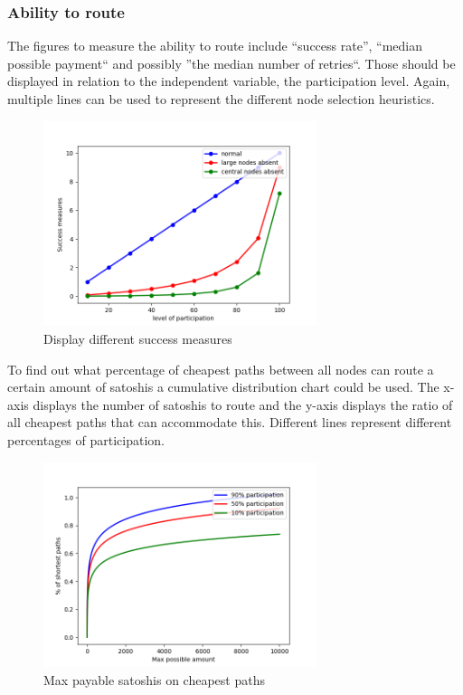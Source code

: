 \documentclass[final]{fhnwreport}       %
\begin{document}
\subsubsection{Ability to route}
The figures to measure the ability to route include ``success rate'', ``median possible payment`` and possibly ''the median number of retries``. Those should be displayed in relation to the independent variable, the participation level. Again, multiple lines can be used to represent the different node selection heuristics.

\begin{figure}[h]
\centering
\includegraphics[width=8cm]{dummy_charts/success_measure.png}
\caption{Display different success measures}
\label{fig:Figure}
\end{figure}

To find out what percentage of cheapest paths between all nodes can route a certain amount of satoshis a cumulative distribution chart could be used. The x-axis displays the number of satoshis to route and the y-axis displays the ratio of all cheapest paths that can accommodate this. Different lines represent different percentages of participation.

\begin{figure}[h]
\centering
\includegraphics[width=8cm]{dummy_charts/max_payable.png}
\caption{Max payable satoshis on cheapest paths}
\label{fig:Figure}
\end{figure}
\end{document}
